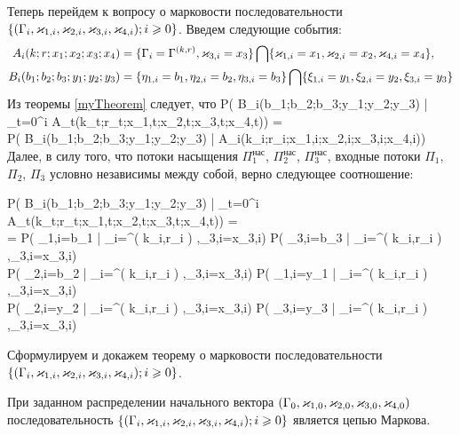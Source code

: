 \documentclass[a4paper,12pt,russian]{extarticle}
\newcommand{\G}{\Gamma}
\renewcommand{\P}[2]{P( #1 | #2)}
\newcommand{\Mark}{\{(\G_i, \vk_{1,i}, \vk_{2,i}, \vk_{3,i}, \vk_{4,i}); i \geqslant 0\}}
\newcommand{\ga}[1]{\Gamma^{\left( #1 \right)} }
\begin{document}
Теперь перейдем к вопросу о марковости последовательности $\Mark$. Введем следующие события:
\begin{align}
A_i(k;r;x_1;x_2;x_3;x_4) &= \{\G_i=\ga{k,r},\vk_{3,i}=x_3\}\bigcap \{\vk_{1,i}=x_1,\vk_{2,i}=x_2,\vk_{4,i}=x_4\},\\
B_i(b_1;b_2;b_3;y_1;y_2;y_3) &= \{\eta_{1,i}=b_1, \eta_{2,i}=b_2,\eta_{3,i}=b_3\} \bigcap \{\xi_{1,i}=y_1,\xi_{2,i}=y_2,\xi_{3,i}=y_3\}
\end{align}
Из теоремы \eqref{myTheorem} следует, что 
\ml
{
\P{B_i(b_1;b_2;b_3;y_1;y_2;y_3)}{\bigcap_{t=0}^{i} A_t(k_t;r_t;x_{1,t};x_{2,t};x_{3,t};x_{4,t})} = \\
\P{B_i(b_1;b_2;b_3;y_1;y_2;y_3)}{A_i(k_i;r_i;x_{1,i};x_{2,i};x_{3,i};x_{4,i})}
}
Далее, в силу того, что потоки насыщения $\Pi_1^{\mathrm{\text{нас}}}$,  $\Pi_2^{\mathrm{\text{нас}}}$, $\Pi_3^{\mathrm{\text{нас}}}$, входные потоки $\Pi_1$, $\Pi_2$, $\Pi_3$ условно независимы между собой, верно следующее соотношение:

\ml
{
\label{etaXiIndependence}
\P{B_i(b_1;b_2;b_3;y_1;y_2;y_3)}{\bigcap_{t=0}^{i} A_t(k_t;r_t;x_{1,t};x_{2,t};x_{3,t};x_{4,t})} = \\
= \P{\eta_{1,i}=b_1}{\G_i=\ga{k_i,r_i},\vk_{3,i}=x_{3,i}} \times 
\P{\eta_{3,i}=b_3}{\G_i=\ga{k_i,r_i},\vk_{3,i}=x_{3,i}} \times \\
\P{\eta_{2,i}=b_2}{\G_i=\ga{k_i,r_i},\vk_{3,i}=x_{3,i}} \times \P{\xi_{1,i}=y_1}{\G_i=\ga{k_i,r_i},\vk_{3,i}=x_{3,i}} \times\\
\times  \P{\xi_{2,i}=y_2}{\G_i=\ga{k_i,r_i},\vk_{3,i}=x_{3,i}} \times 
\P{\xi_{3,i}=y_3}{\G_i=\ga{k_i,r_i},\vk_{3,i}=x_{3,i}}
}

Сформулируем и докажем теорему о марковости последовательности \linebreak$\Mark$.
\begin{theorem}
При заданном распределении начального вектора $(\G_0,\vk_{1,0},\vk_{2,0},\vk_{3,0},\vk_{4,0})$ последовательность $\Mark$ является цепью Маркова. 
\end{theorem}
\end{document}
